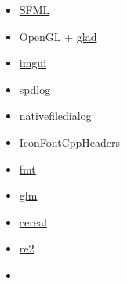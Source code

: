\begin{itemize}
	\item{\href{https://www.sfml-dev.org/}{SFML}}

	\item{OpenGL + \href{https://github.com/Dav1dde/glad}{glad}}

	\item{\href{https://github.com/ocornut/imgui}{imgui}}

	\item{\href{https://github.com/gabime/spdlog}{spdlog}}

	\item{\href{https://github.com/mlabbe/nativefiledialog}{nativefiledialog}}

	\item{\href{https://github.com/juliettef/IconFontCppHeaders}{IconFontCppHeaders}}

	\item{\href{https://github.com/fmtlib/fmt}{fmt}}

	\item{\href{https://github.com/g-truc/glm}{glm}}

	\item{\href{https://github.com/USCiLab/cereal}{cereal}}

	\item{\href{https://github.com/google/re2}{re2}}

	\item{\href{}{}}
		\subitem{}
 \end{itemize}
